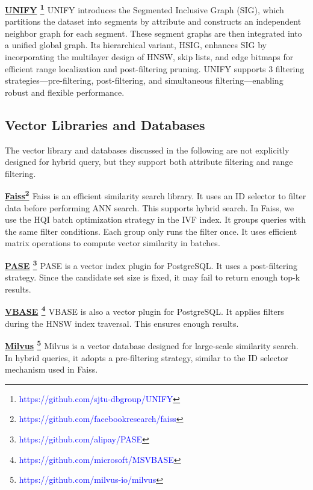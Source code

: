 \documentclass[sigconf, nonacm]{acmart}
\begin{document}
{	\noindent\textbf{\underline{UNIFY} \footnote{\textcolor{blue}{https://github.com/sjtu-dbgroup/UNIFY}} \cite{UNIFY}}
	UNIFY introduces the Segmented Inclusive Graph (SIG), which partitions the dataset into segments by attribute and constructs an independent neighbor graph for each segment. These segment graphs are then integrated into a unified global graph. Its hierarchical variant, HSIG, enhances SIG by incorporating the multilayer design of HNSW, skip lists, and edge bitmaps for efficient range localization and post-filtering pruning. UNIFY supports 3 filtering strategies—pre-filtering, post-filtering, and  simultaneous filtering—enabling robust and flexible performance.
	
	
	
	\subsection{Vector Libraries and Databases}
The vector library and databases discussed in the following are not explicitly designed for hybrid query, but they support both attribute filtering and range filtering. 

\noindent\textbf{\underline{Faiss}\footnote{\textcolor{blue}{https://github.com/facebookresearch/faiss}} \cite{Faiss}}
Faiss is an efficient similarity search library. It uses an ID selector to filter data before performing ANN search. This supports hybrid search. In Faiss, we use the HQI batch optimization strategy in the IVF index. It groups queries with the same filter conditions. Each group only runs the filter once. It uses efficient matrix operations to compute vector similarity in batches.

\noindent\textbf{\underline{PASE} \footnote{\textcolor{blue}{https://github.com/alipay/PASE}} \cite{pase}} PASE is a vector index plugin for PostgreSQL. It uses a post-filtering strategy. Since the candidate set size is fixed, it may fail to return enough top-k results.

\noindent\textbf{\underline{VBASE} \footnote{\textcolor{blue}{https://github.com/microsoft/MSVBASE}} \cite{vbase}} VBASE is also a vector plugin for PostgreSQL. It applies filters during the HNSW index traversal. This ensures enough results.

\noindent\textbf{\underline{Milvus} \footnote{\textcolor{blue}{https://github.com/milvus-io/milvus}} \cite{milvus}} Milvus is a vector database designed for large-scale similarity search. In hybrid queries, it adopts a pre-filtering strategy, similar to the ID selector mechanism used in Faiss.

}
\end{document}
